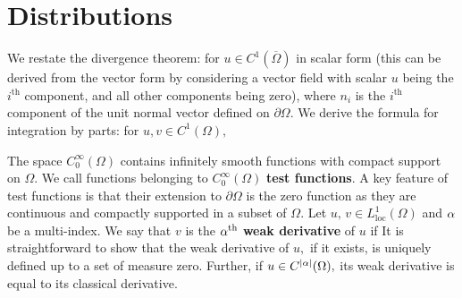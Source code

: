 \section{Distributions}
We restate the divergence theorem: for $u\in C^1(\overline{\Omega})$ in scalar form (this can be derived from the vector form by considering a vector field with scalar $u$ being the $i^\text{th}$ component, and all other components being zero),
where $n_i$ is the $i^\text{th}$ component of the unit normal vector defined on $\partial\Omega.$ We derive the formula for integration by parts: for $u,v\in C^1(\Omega),$

The space $C_0^\infty(\Omega)$ contains infinitely smooth functions with compact support on $\Omega.$ We call functions belonging to $C_0^\infty(\Omega)$ \textbf{test functions}. A key feature of test functions is that their extension to $\partial\Omega$ is the zero function as they are continuous and compactly supported in a subset of $\Omega.$ Let $u,\,v\in L^1_{\mathrm{loc}}(\Omega)$ and $\alpha$ be a multi-index. We say that $v$ is the $\alpha^\mathrm{th}$ \textbf{weak derivative} of $u$ if
It is straightforward to show that the weak derivative of $u,$ if it exists, is uniquely defined up to a set of measure zero. Further, if $u\in C^\abs{\alpha}(\Omega),$ its weak derivative is equal to its classical derivative.

